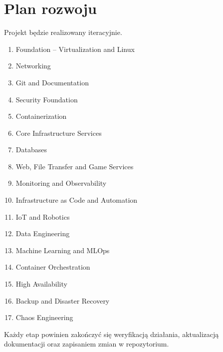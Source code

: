 \section{Plan rozwoju}

Projekt będzie realizowany iteracyjnie.

\begin{enumerate}
    \item Foundation -- Virtualization and Linux
    \item Networking
    \item Git and Documentation
    \item Security Foundation
    \item Containerization
    \item Core Infrastructure Services
    \item Databases
    \item Web, File Transfer and Game Services
    \item Monitoring and Observability
    \item Infrastructure as Code and Automation
    \item IoT and Robotics
    \item Data Engineering
    \item Machine Learning and MLOps
    \item Container Orchestration
    \item High Availability
    \item Backup and Disaster Recovery
    \item Chaos Engineering
\end{enumerate}

Każdy etap powinien zakończyć się weryfikacją działania,
aktualizacją dokumentacji oraz zapisaniem zmian w repozytorium.